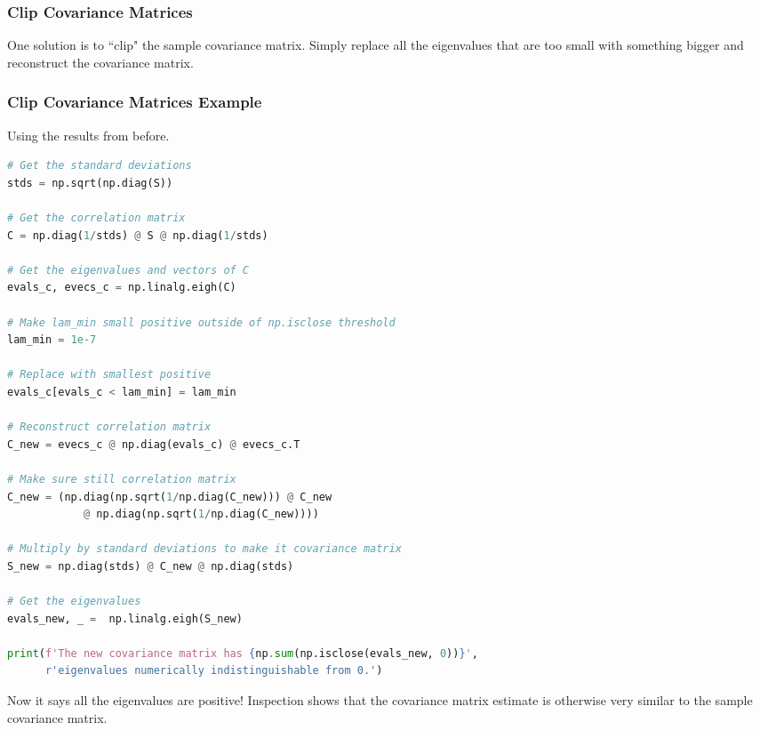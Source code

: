\documentclass{beamer}
\begin{document}
\begin{frame}
\frametitle{Clip Covariance Matrices}

One solution is to ``clip" the sample covariance matrix. Simply replace all the eigenvalues that are too small with something bigger and reconstruct the covariance matrix.

\end{frame}

\begin{frame}[fragile]
\frametitle{Clip Covariance Matrices Example}
\small
Using the results from before. 
\begin{multicols}{2}
\begin{lstlisting}[language=Python]
# Get the standard deviations
stds = np.sqrt(np.diag(S))

# Get the correlation matrix
C = np.diag(1/stds) @ S @ np.diag(1/stds)

# Get the eigenvalues and vectors of C
evals_c, evecs_c = np.linalg.eigh(C)

# Make lam_min small positive outside of np.isclose threshold
lam_min = 1e-7

# Replace with smallest positive
evals_c[evals_c < lam_min] = lam_min

# Reconstruct correlation matrix
C_new = evecs_c @ np.diag(evals_c) @ evecs_c.T

# Make sure still correlation matrix
C_new = (np.diag(np.sqrt(1/np.diag(C_new))) @ C_new
            @ np.diag(np.sqrt(1/np.diag(C_new))))

# Multiply by standard deviations to make it covariance matrix
S_new = np.diag(stds) @ C_new @ np.diag(stds)

# Get the eigenvalues
evals_new, _ =  np.linalg.eigh(S_new)

print(f'The new covariance matrix has {np.sum(np.isclose(evals_new, 0))}',
      r'eigenvalues numerically indistinguishable from 0.')
\end{lstlisting}
\end{multicols}
Now it says all the eigenvalues are positive! Inspection shows that the covariance matrix estimate is otherwise very similar to the sample covariance matrix.
\end{frame}
\end{document}
